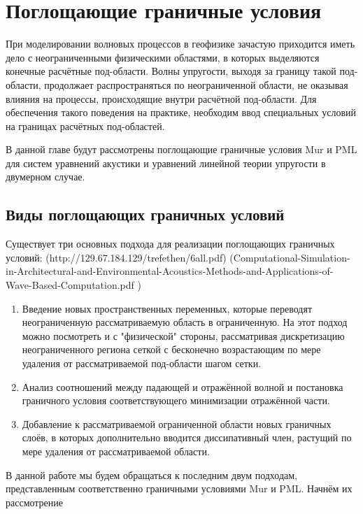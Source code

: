 \section{Поглощающие граничные условия} \label{sec:absorbing}

При моделировании волновых процессов в геофизике зачастую приходится иметь дело с неограниченными физическими областями, в которых выделяются конечные расчётные под-области. Волны упругости, выходя за границу такой под-области, продолжает распространяться по неограниченной области, не оказывая влияния на процессы, происходящие внутри расчётной под-области. Для обеспечения такого поведения на практике, необходим ввод специальных условий на границах расчётных под-областей.

В данной главе будут рассмотрены поглощающие граничные условия Mur и PML для систем уравнений акустики и уравнений линейной теории упругости в двумерном случае. 

\subsection{Виды поглощающих граничных условий}

Существует три основных подхода для реализации поглощающих граничных условий: (http://129.67.184.129/trefethen/6all.pdf)
(Computational-Simulation-in-Architectural-and-Environmental-Acoustics-Methods-and-Applications-of-Wave-Based-Computation.pdf
)
\begin{enumerate}
    \item  Введение новых пространственных переменных, которые переводят неограниченную рассматриваемую область в ограниченную. На этот подход можно посмотреть и с "физической" стороны, рассматривая дискретизацию неограниченного региона сеткой с бесконечно возрастающим по мере удаления от рассматриваемой под-области шагом сетки.
    \item Анализ соотношений между падающей и отражённой волной и постановка граничного условия соответствующего минимизации отражённой части.
    \item Добавление к рассматриваемой ограниченной области новых граничных слоёв, в которых дополнительно вводится диссипативный член, растущий по мере удаления от рассматриваемой области.
\end{enumerate}

В данной работе мы будем обращаться к последним двум подходам, представленным соответственно граничными условиями Mur и PML. Начнём их рассмотрение 

